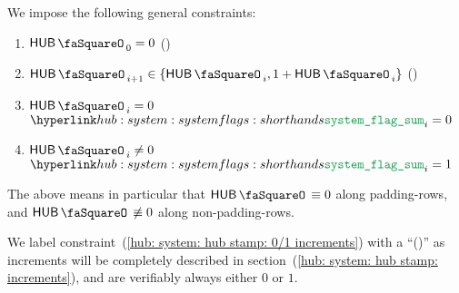 We impose the following general constraints:
\begin{enumerate}
	\item $\hubStamp _{0} = 0$ (\sanityCheck)
	\item \label{hub: system: hub stamp: 0/1 increments} $\hubStamp _{i + 1} \in \{ \hubStamp _{i}, 1 + \hubStamp _{i}\}$ (\sanityCheck)
	\item \If $\hubStamp _{i} =    0$ \Then $\flagSum _{i} = 0$
	\item \If $\hubStamp _{i} \neq 0$ \Then $\flagSum _{i} = 1$
\end{enumerate}
\saNote{}
The above means in particular that
$\hubStamp \equiv  0$ along padding-rows, and
$\hubStamp \not\equiv 0$ along non-padding-rows.

\saNote{}
We label constraint~(\ref{hub: system: hub stamp: 0/1 increments})
with a ``(\sanityCheck)'' as \hubStamp{} increments will be completely described in
section~(\ref{hub: system: hub stamp: increments}),
and are verifiably always either $0$ or $1$.
